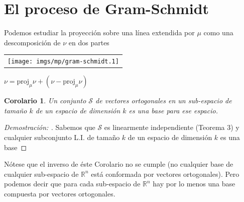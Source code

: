\documentclass[11pt]{article}
\newtheorem{corolario}[thm]{Corolario}
\theoremstyle{definition}
\begin{document}
\section*{El proceso de Gram-Schmidt}
Podemos estudiar la proyección sobre una línea extendida por $\mu$ como una descomposición de $\nu$ en dos partes

\begin{center}  \small
 \begin{tabular}{@{}c@{}}\texttt{[image: imgs/mp/gram-schmidt.1]}\end{tabular}
  \hspace*{6em}
  $\nu = \textrm{proj}_{\mu}{\nu} + (\nu - \textrm{proj}_{\mu}{\nu})$
\end{center}

\begin{corolario}
	Un conjunto $\mathcal{S}$ de vectores ortogonales en un sub-espacio de tamaño $k$ de un espacio de dimensión $k$ es una base para ese espacio.
\end{corolario}

\begin{proof}[Demostración: ]
	Sabemos que $\mathcal{S}$ es linearmente independiente (Teorema 3) y cualquier subconjunto L.I. de tamaño $k$ de un espacio de dimensión $k$ es una base
\end{proof}

Nótese que el inverso de éste Corolario no se cumple (no cualquier base de cualquier sub-espacio de $\mathbb{R}^n$ está conformada por vectores ortogonales). Pero podemos decir que para cada sub-espacio de $\mathbb{R}^n$ hay por lo menos una base compuesta por vectores ortogonales.
\end{document}
